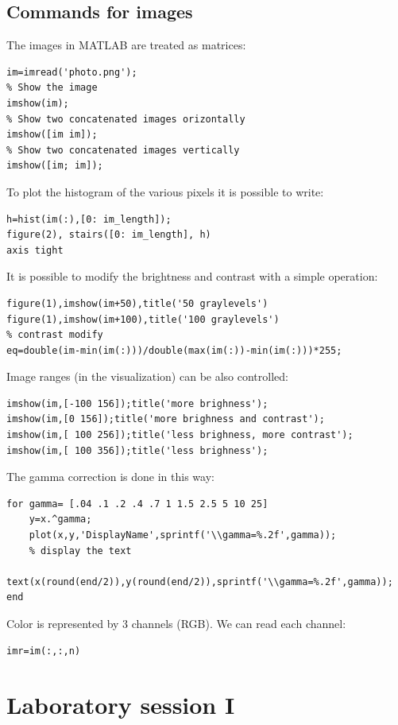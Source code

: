 \documentclass[12pt, a4paper]{report}
\begin{document}
    \section{Commands for images}
    The images in MATLAB are treated as matrices:
    \begin{lstlisting}[style=Matlab]
im=imread('photo.png');
% Show the image
imshow(im);
% Show two concatenated images orizontally
imshow([im im]);
% Show two concatenated images vertically
imshow([im; im]);
    \end{lstlisting}
    To plot the histogram of the various pixels it is possible to write: 
    \begin{lstlisting}[style=Matlab]
h=hist(im(:),[0: im_length]);
figure(2), stairs([0: im_length], h)
axis tight
    \end{lstlisting}
    It is possible to modify the brightness and contrast with a simple operation:
    \begin{lstlisting}[style=Matlab]
figure(1),imshow(im+50),title('50 graylevels')
figure(1),imshow(im+100),title('100 graylevels')
% contrast modify
eq=double(im-min(im(:)))/double(max(im(:))-min(im(:)))*255;
    \end{lstlisting}
    Image ranges (in the visualization) can be also controlled:
    \begin{lstlisting}[style=Matlab]
imshow(im,[-100 156]);title('more brighness');
imshow(im,[0 156]);title('more brighness and contrast');
imshow(im,[ 100 256]);title('less brighness, more contrast');
imshow(im,[ 100 356]);title('less brighness');
    \end{lstlisting}
    The gamma correction is done in this way: 
    \begin{lstlisting}[style=Matlab]
for gamma= [.04 .1 .2 .4 .7 1 1.5 2.5 5 10 25]
    y=x.^gamma;
    plot(x,y,'DisplayName',sprintf('\\gamma=%.2f',gamma));
    % display the text
    text(x(round(end/2)),y(round(end/2)),sprintf('\\gamma=%.2f',gamma));
end
    \end{lstlisting}
    Color is represented by 3 channels (RGB). We can read each channel:
    \begin{lstlisting}[style=Matlab]
% n=1 for red, n=2 for green, and n=3 for blue
imr=im(:,:,n)
    \end{lstlisting}

    \newpage

\chapter{Laboratory session I}
\end{document}
